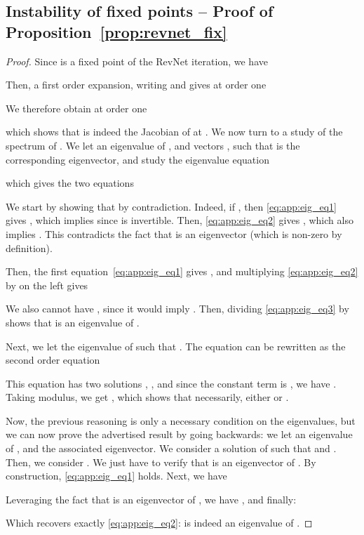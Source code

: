 \documentclass{article}
\begin{document}
\subsection{Instability of fixed points -- Proof of Proposition~\ref{prop:revnet_fix}}
\begin{proof}
Since  is a fixed point of the RevNet iteration, we have



Then, a first order expansion, writing  and  gives at order one


We therefore obtain at order one

which shows that  is indeed the Jacobian of  at .
We now turn to a study of the spectrum of .
We let  an eigenvalue of , and vectors ,  such that  is the corresponding eigenvector, and study the eigenvalue equation

which gives the two equations



We start by showing that  by contradiction.
Indeed, if , then \eqref{eq:app:eig_eq1} gives , which implies  since  is invertible. Then, \eqref{eq:app:eig_eq2} gives , which also implies . This contradicts the fact that  is an eigenvector (which is non-zero by definition).

Then, the first equation~\eqref{eq:app:eig_eq1} gives , and multiplying \eqref{eq:app:eig_eq2} by  on the left gives


We also cannot have , since it would imply .
Then, dividing \eqref{eq:app:eig_eq3} by  shows that  is an eigenvalue of .

Next, we let  the eigenvalue of  such that .
The equation can be rewritten as the second order equation 


This equation has two solutions , , and since the constant term is , we have . Taking modulus, we get 
, which shows that necessarily, either  or .


Now, the previous reasoning is only a necessary condition on the eigenvalues, but we can now prove the advertised result by going backwards: we let  an eigenvalue of , and  the associated eigenvector. We consider  a solution of  such that  and . Then, we consider . We just have to verify that  is an eigenvector of . By construction, \eqref{eq:app:eig_eq1} holds.
Next, we have 

Leveraging the fact that  is an eigenvector of , we have , and finally:


Which recovers exactly \eqref{eq:app:eig_eq2}:  is indeed an eigenvalue of .
\end{proof}
\end{document}
